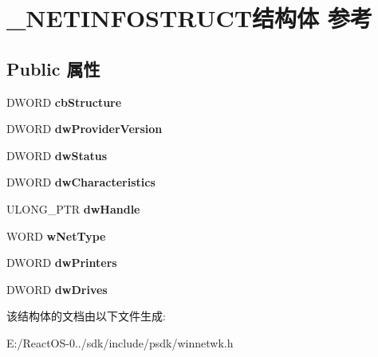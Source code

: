 \hypertarget{struct___n_e_t_i_n_f_o_s_t_r_u_c_t}{}\section{\+\_\+\+N\+E\+T\+I\+N\+F\+O\+S\+T\+R\+U\+C\+T结构体 参考}
\label{struct___n_e_t_i_n_f_o_s_t_r_u_c_t}
\subsection*{Public 属性}
\begin{DoxyCompactItemize}
\item 
\mbox{\label{struct___n_e_t_i_n_f_o_s_t_r_u_c_t_a3cc7651c9ca881b1d973d87850c1b244}} 
D\+W\+O\+RD {\bfseries cb\+Structure}
\item 
\mbox{\label{struct___n_e_t_i_n_f_o_s_t_r_u_c_t_a97d9c2c2e72af39f26da13fc1c53278d}} 
D\+W\+O\+RD {\bfseries dw\+Provider\+Version}
\item 
\mbox{\label{struct___n_e_t_i_n_f_o_s_t_r_u_c_t_af8933009882e9a78d46c71f941080dc4}} 
D\+W\+O\+RD {\bfseries dw\+Status}
\item 
\mbox{\label{struct___n_e_t_i_n_f_o_s_t_r_u_c_t_ae9d6c7c1e4e1a42d6849bd8692e92c42}} 
D\+W\+O\+RD {\bfseries dw\+Characteristics}
\item 
\mbox{\label{struct___n_e_t_i_n_f_o_s_t_r_u_c_t_aeba40df552dbbfcfe1df2788e5da12c6}} 
U\+L\+O\+N\+G\+\_\+\+P\+TR {\bfseries dw\+Handle}
\item 
\mbox{\label{struct___n_e_t_i_n_f_o_s_t_r_u_c_t_ad3166084fbbb0c6bee304217aa5c0f6c}} 
W\+O\+RD {\bfseries w\+Net\+Type}
\item 
\mbox{\label{struct___n_e_t_i_n_f_o_s_t_r_u_c_t_a996c7efa4193a3036dbc5a6156a89d3a}} 
D\+W\+O\+RD {\bfseries dw\+Printers}
\item 
\mbox{\label{struct___n_e_t_i_n_f_o_s_t_r_u_c_t_aafe54bf0fc2e17e4f6d9fc70ba89c6a7}} 
D\+W\+O\+RD {\bfseries dw\+Drives}
\end{DoxyCompactItemize}


该结构体的文档由以下文件生成\+:\begin{DoxyCompactItemize}
\item 
E\+:/\+React\+O\+S-\/0../sdk/include/psdk/winnetwk.\+h\end{DoxyCompactItemize}
